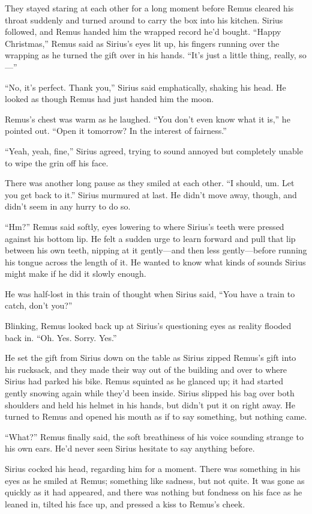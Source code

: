 They stayed staring at each other for a long moment before Remus cleared his throat suddenly and turned around to carry the box into his kitchen. Sirius followed, and Remus handed him the wrapped record he’d bought. “Happy Christmas,” Remus said as Sirius’s eyes lit up, his fingers running over the wrapping as he turned the gift over in his hands. “It’s just a little thing, really, so—”

“No, it’s perfect. Thank you,” Sirius said emphatically, shaking his head. He looked as though Remus had just handed him the moon.

Remus’s chest was warm as he laughed. “You don’t even know what it is,” he pointed out. “Open it tomorrow? In the interest of fairness.”

“Yeah, yeah, fine,” Sirius agreed, trying to sound annoyed but completely unable to wipe the grin off his face.

There was another long pause as they smiled at each other. “I should, um. Let you get back to it.” Sirius murmured at last. He didn’t move away, though, and didn’t seem in any hurry to do so.

“Hm?” Remus said softly, eyes lowering to where Sirius’s teeth were pressed against his bottom lip. He felt a sudden urge to learn forward and pull that lip between his own teeth, nipping at it gently—and then less gently—before running his tongue across the length of it. He wanted to know what kinds of sounds Sirius might make if he did it slowly enough.

He was half-lost in this train of thought when Sirius said, “You have a train to catch, don’t you?”

Blinking, Remus looked back up at Sirius’s questioning eyes as reality flooded back in. “Oh. Yes. Sorry. Yes.”

He set the gift from Sirius down on the table as Sirius zipped Remus’s gift into his rucksack, and they made their way out of the building and over to where Sirius had parked his bike. Remus squinted as he glanced up; it had started gently snowing again while they’d been inside. Sirius slipped his bag over both shoulders and held his helmet in his hands, but didn’t put it on right away. He turned to Remus and opened his mouth as if to say something, but nothing came.

“What?” Remus finally said, the soft breathiness of his voice sounding strange to his own ears. He'd never seen Sirius hesitate to say anything before.

Sirius cocked his head, regarding him for a moment. There was something in his eyes as he smiled at Remus; something like sadness, but not quite. It was gone as quickly as it had appeared, and there was nothing but fondness on his face as he leaned in, tilted his face up, and pressed a kiss to Remus’s cheek.

